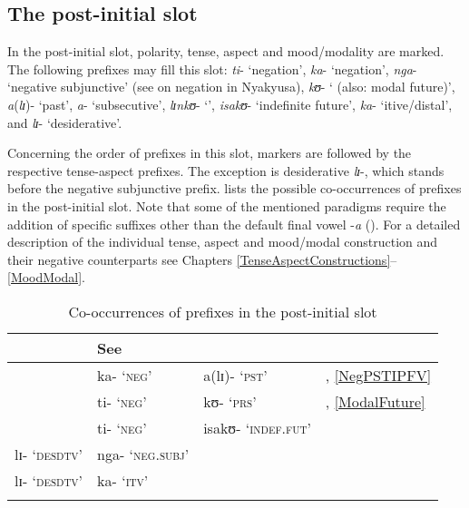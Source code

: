 \subsection{The post-initial slot}
In the post-initial slot, polarity, tense, aspect and mood/modality are marked. The following prefixes may fill this slot: \textit{ti}- \lq negation', \textit{ka}- \lq negation', \textit{nga}- \lq negative subjunctive' (see  on negation in Nyakyusa), \textit{kʊ}- \lq {} (also: modal future)', \textit{a}(\textit{lɪ})- \lq past', \textit{a}- \lq subsecutive', \textit{lɪnkʊ}- \lq {}', \textit{isakʊ}- \lq indefinite future', \textit{ka}- \lq itive/distal', and \textit{lɪ}- \lq desiderative'. 

Concerning the order of prefixes in this slot,  markers are followed by the respective tense-aspect prefixes. The exception is desiderative \textit{lɪ}-, which stands before the negative subjunctive prefix.  lists the possible co-occurrences of prefixes in the post-initial slot. Note that some of the mentioned paradigms require the addition of specific suffixes other than the default final vowel -\textit{a} (). For a detailed description of the individual tense, aspect and mood/modal construction and their negative counterparts see Chapters \ref{TenseAspectConstructions}--\ref{MoodModal}.


\begin{table}[H]
	\begin{center}
		\begin{tabular}{llll}
			\lsptoprule
			\multicolumn{3}{l}{\footnotesize{Prefixes}} & \footnotesize{See}\\
			\midrule
			& ka- \lq\textsc{neg}' & a(lɪ)- \lq\textsc{pst}' & \sectref{NEGPstPFV}, \ref{NegPSTIPFV}\\
			& ti- \lq\textsc{neg}' & kʊ- \lq\textsc{prs}' & \sectref{Present}, \ref{ModalFuture}\\
			& ti- \lq\textsc{neg}' & isakʊ- \lq\textsc{indef.fut}' & \sectref{isaFut}\\
			lɪ- \lq\textsc{desdtv}' & nga- \lq\textsc{neg.subj}' && \sectref{NegativeSubjunctive}\\
			lɪ- \lq\textsc{desdtv}' & ka- \lq \textsc{itv}' && \sectref{Desiderative}\\
			\lspbottomrule  
		\end{tabular}
		\caption{Co-occurrences of prefixes in the post-initial slot}\label{TablePostInitialPrefix}
	
	\end{center}
\end{table}

